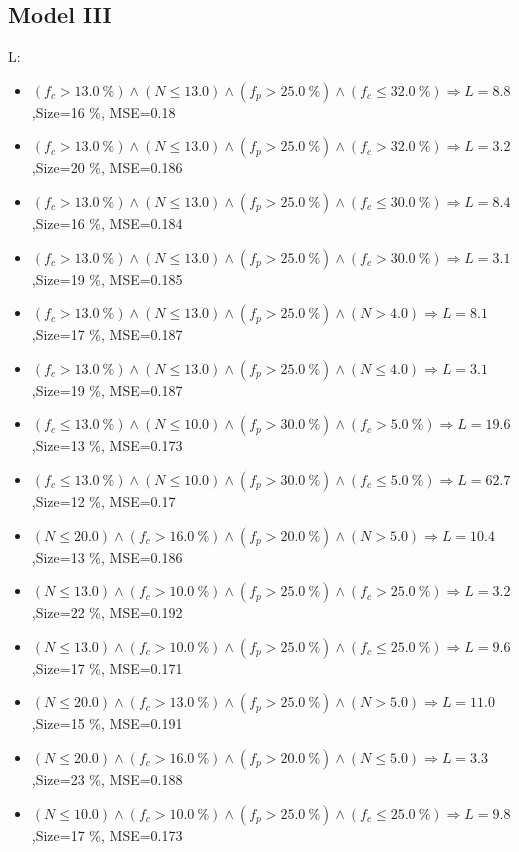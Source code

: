 \documentclass[numbered]{CSL}
\begin{document}
\subsection{Model III}
L:
\begin{itemize}
\item $(f_c > 13.0~\%) \land (N \leq 13.0) \land (f_p > 25.0~\%) \land (f_c \leq 32.0~\%) \Rightarrow L = 8.8$,\hfill Size=16 \%, MSE=0.18
\item $(f_c > 13.0~\%) \land (N \leq 13.0) \land (f_p > 25.0~\%) \land (f_c > 32.0~\%) \Rightarrow L = 3.2$,\hfill Size=20 \%, MSE=0.186
\item $(f_c > 13.0~\%) \land (N \leq 13.0) \land (f_p > 25.0~\%) \land (f_c \leq 30.0~\%) \Rightarrow L = 8.4$,\hfill Size=16 \%, MSE=0.184
\item $(f_c > 13.0~\%) \land (N \leq 13.0) \land (f_p > 25.0~\%) \land (f_c > 30.0~\%) \Rightarrow L = 3.1$,\hfill Size=19 \%, MSE=0.185
\item $(f_c > 13.0~\%) \land (N \leq 13.0) \land (f_p > 25.0~\%) \land (N > 4.0) \Rightarrow L = 8.1$,\hfill Size=17 \%, MSE=0.187
\item $(f_c > 13.0~\%) \land (N \leq 13.0) \land (f_p > 25.0~\%) \land (N \leq 4.0) \Rightarrow L = 3.1$,\hfill Size=19 \%, MSE=0.187
\item $(f_c \leq 13.0~\%) \land (N \leq 10.0) \land (f_p > 30.0~\%) \land (f_c > 5.0~\%) \Rightarrow L = 19.6$,\hfill Size=13 \%, MSE=0.173
\item $(f_c \leq 13.0~\%) \land (N \leq 10.0) \land (f_p > 30.0~\%) \land (f_c \leq 5.0~\%) \Rightarrow L = 62.7$,\hfill Size=12 \%, MSE=0.17
\item $(N \leq 20.0) \land (f_c > 16.0~\%) \land (f_p > 20.0~\%) \land (N > 5.0) \Rightarrow L = 10.4$,\hfill Size=13 \%, MSE=0.186
\item $(N \leq 13.0) \land (f_c > 10.0~\%) \land (f_p > 25.0~\%) \land (f_c > 25.0~\%) \Rightarrow L = 3.2$,\hfill Size=22 \%, MSE=0.192
\item $(N \leq 13.0) \land (f_c > 10.0~\%) \land (f_p > 25.0~\%) \land (f_c \leq 25.0~\%) \Rightarrow L = 9.6$,\hfill Size=17 \%, MSE=0.171
\item $(N \leq 20.0) \land (f_c > 13.0~\%) \land (f_p > 25.0~\%) \land (N > 5.0) \Rightarrow L = 11.0$,\hfill Size=15 \%, MSE=0.191
\item $(N \leq 20.0) \land (f_c > 16.0~\%) \land (f_p > 20.0~\%) \land (N \leq 5.0) \Rightarrow L = 3.3$,\hfill Size=23 \%, MSE=0.188
\item $(N \leq 10.0) \land (f_c > 10.0~\%) \land (f_p > 25.0~\%) \land (f_c \leq 25.0~\%) \Rightarrow L = 9.8$,\hfill Size=17 \%, MSE=0.173

\end{itemize}
\end{document}
